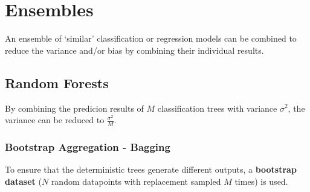 \section{Ensembles}
An ensemble of `similar' classification or regression models can be combined to reduce the variance and/or bias by combining their individual results.

\subsection{Random Forests}
By combining the predicion results of $M$ classification trees with variance $\sigma^2$, the variance can be reduced to $\frac{\sigma^2}{M}$.

\subsubsection{Bootstrap Aggregation - Bagging}
To ensure that the deterministic trees generate different outputs, a \textbf{bootstrap dataset} ($N$ random datapoints with replacement sampled $M$ times) is used.

